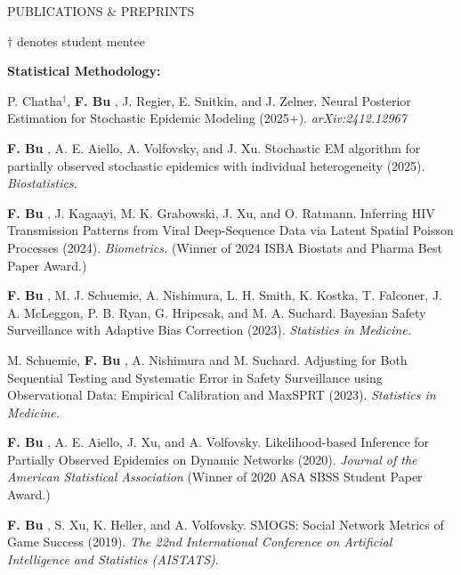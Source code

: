 \documentclass{resume} %
\newcommand{\thisYear}[1]{
	#1
}
\newcommand{\myName}[1]{
	\textbf{#1}
}
\begin{document}


\begin{rSection}{PUBLICATIONS \& PREPRINTS}

{\footnotesize $\dagger$ denotes student mentee}

\hspace{-.2in} \textbf{Statistical Methodology:}

P. Chatha$^\dagger$, \myName{F. Bu}, J. Regier, E. Snitkin, and J. Zelner. 
Neural Posterior Estimation for Stochastic Epidemic Modeling (2025+). 	\textit{arXiv:2412.12967}

\smallskip

\thisYear{
\myName{F. Bu}, A. E. Aiello, A. Volfovsky, and J. Xu.  
Stochastic EM algorithm for partially observed stochastic epidemics with individual heterogeneity (2025).  \emph{Biostatistics}.%
}

\smallskip

\myName{F. Bu}, J. Kagaayi, M. K. Grabowski, J. Xu, and O. Ratmann.
Inferring HIV Transmission Patterns from Viral Deep-Sequence Data via Latent Spatial Poisson Processes (2024). \emph{Biometrics.} 
(Winner of 2024 ISBA Biostats and Pharma Best Paper Award.)

\smallskip

\myName{F. Bu}, M. J. Schuemie,  A. Nishimura, L. H. Smith, K. Kostka, T. Falconer, J. A. McLeggon, P. B. Ryan, G. Hripcsak, and M. A. Suchard.
Bayesian Safety Surveillance with Adaptive Bias Correction (2023). \emph{Statistics in Medicine.} %

\smallskip


M. Schuemie, \myName{F. Bu}, A. Nishimura and M. Suchard.
Adjusting for Both Sequential Testing and Systematic Error in Safety Surveillance using Observational Data: Empirical Calibration and MaxSPRT (2023). \emph{Statistics in Medicine.}

\smallskip


\myName{F. Bu}, A. E. Aiello, J. Xu, and A. Volfovsky. 
Likelihood-based Inference for Partially Observed Epidemics on Dynamic Networks (2020). \emph{Journal of the American Statistical Association} (Winner of 2020 ASA SBSS Student Paper Award.) %

\smallskip

\myName{F. Bu}, S. Xu, K. Heller, and A. Volfovsky. 
SMOGS: Social Network Metrics of Game Success (2019). \emph{The 22nd International Conference on Artificial Intelligence and Statistics (AISTATS)}. %


\end{rSection}
\end{document}
